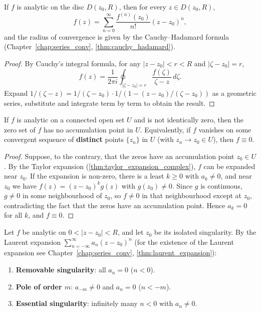 \begin{theorem}\label{thm:taylor_expansion_complex}
If $f$ is analytic on the disc $D(z_0, R)$, then for every $z \in D(z_0, R)$,
\[
f(z) = \sum_{n=0}^{\infty} \frac{f^{(n)}(z_0)}{n!}(z-z_0)^n,
\]
and the radius of convergence is given by the Cauchy--Hadamard formula (Chapter~\ref{chap:series_conv}, \cref{thm:cauchy_hadamard}).
\end{theorem}

\begin{proof}
By Cauchy's integral formula, for any $|z - z_0| < r < R$ and $|\zeta - z_0| = r$,
\[
f(z) = \frac{1}{2\pi i} \oint_{|\zeta - z_0| = r} \frac{f(\zeta)}{\zeta - z}\,d\zeta.
\]
Expand $1/(\zeta - z) = 1/(\zeta - z_0) \cdot 1/(1 - (z - z_0)/(\zeta - z_0))$ as a geometric series, substitute and integrate term by term to obtain the result.
\end{proof}

\begin{corollary}\label{cor:zero_isolated}
If $f$ is analytic on a connected open set $U$ and is not identically zero, then the zero set of $f$ has no accumulation point in $U$. Equivalently, if $f$ vanishes on some convergent sequence of \textbf{distinct} points $\{z_n\}$ in $U$ (with $z_n \to z_0 \in U$), then $f \equiv 0$.
\end{corollary}

\begin{proof}
Suppose, to the contrary, that the zeros have an accumulation point $z_0 \in U$. By the Taylor expansion (\cref{thm:taylor_expansion_complex}), $f$ can be expanded near $z_0$. If the expansion is non-zero, there is a least $k \ge 0$ with $a_k \ne 0$, and near $z_0$ we have $f(z) = (z-z_0)^k g(z)$ with $g(z_0) \ne 0$. Since $g$ is continuous, $g \ne 0$ in some neighbourhood of $z_0$, so $f \ne 0$ in that neighbourhood except at $z_0$, contradicting the fact that the zeros have an accumulation point. Hence $a_k = 0$ for all $k$, and $f \equiv 0$.
\end{proof}

\begin{definition}\label{def:singularity_types}
Let $f$ be analytic on $0 < |z-z_0| < R$, and let $z_0$ be its isolated singularity. By the Laurent expansion $\sum_{n=-\infty}^{\infty} a_n (z-z_0)^n$ (for the existence of the Laurent expansion see Chapter~\ref{chap:series_conv}, \cref{thm:laurent_expansion}):
\begin{enumerate}[label=(\roman*)]
    \item \textbf{Removable singularity}: all $a_n = 0$ ($n < 0$).
    \item \textbf{Pole of order $m$}: $a_{-m} \neq 0$ and $a_n = 0$ ($n < -m$).
    \item \textbf{Essential singularity}: infinitely many $n < 0$ with $a_n \neq 0$.
\end{enumerate}
\end{definition}


